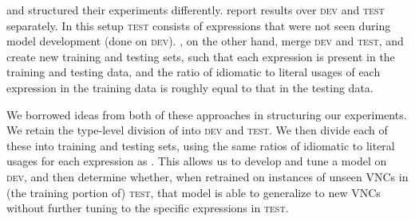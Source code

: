 \documentclass[11pt,a4paper]{article}
\newcommand{\dev}{\textsc{dev}\xspace}
\newcommand{\test}{\textsc{test}\xspace}
\begin{document}
 and  structured
their experiments differently. \citeauthor{Fazly2009} report results
over \dev and \test separately. In this setup
\test consists of expressions that were not seen during model
development (done on \dev). \citeauthor{salton-ross-kelleher},
on the other hand, merge \dev and \test, and create
new training and testing sets, such that each expression is present in
the training and testing data, and the ratio of idiomatic to literal
usages of each expression in the training data is roughly equal to
that in the testing data.



We borrowed ideas from both of these approaches in structuring our
experiments. We retain the type-level division of 
 into \dev and \test. We then divide each of
these into training and testing sets, using the same ratios of
idiomatic to literal usages for each expression as
.
This allows us to develop and tune a model on \dev, and then determine
whether, when retrained on instances of unseen VNCs in (the training
portion of) \test, that model is able to generalize to new VNCs
without further tuning to the specific expressions in \test.


\end{document}
